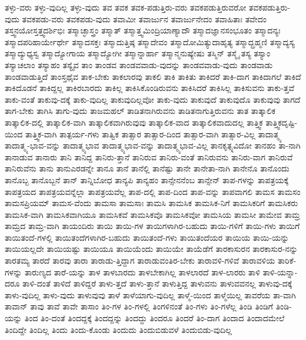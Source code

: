 {ತಳ್ಳು-ವರು
ತಳ್ಳು-ವುದಿಲ್ಲ
ತಳ್ಳು-ವುದು
ತವ
ತವಕ
ತವಕ-ಪಡುತ್ತಿರು-ವರು
ತವಕಪಡುತ್ತಿರುವರೋ
ತವಕಪಡುತ್ತಿರು-ವುದು
ತವಕಪಡು-ವರು
ತವಕಪಡು-ವುದು
ತವಾಮೀ
ತವಾರ್ಜುನ
ತವಾರ್ಜುನೇದಂ
ತವಾಹಿತಾಃ
ತವೇದಂ
ತಸ್ತ್ವನಯೋಸ್ತತ್ತ್ವದರ್ಶಿಭಿಃ
ತಸ್ಮಾಚ್ಛಾಸ್ತ್ರಂ
ತಸ್ಮಾತ್
ತಸ್ಮಾತ್ತ್ವಮಿಂದ್ರಿಯಾಣ್ಯಾದೌ
ತಸ್ಮಾದಜ್ಞಾನಸಂಭೂತಂ
ತಸ್ಮಾದನ್ಯಃ
ತಸ್ಮಾದಪರಿಹಾರ್ಯೇರ್ಥೇ
ತಸ್ಮಾದಸಕ್ತಃ
ತಸ್ಮಾದುತ್ತಿಷ್ಠ
ತಸ್ಮಾದೇವಂ
ತಸ್ಮಾದೋಮಿತ್ಯುದಾಹೃತ್ಯ
ತಸ್ಮಾದ್ಬ್ರಹ್ಮಣಿ
ತಸ್ಮಾದ್ಯಸ್ಯ
ತಸ್ಮಾದ್ಯುಧ್ಯಸ್ವ
ತಸ್ಮಾದ್ಯೋಗಾಯ
ತಸ್ಮಾದ್ಯೋಗೀ
ತಸ್ಮಾನ್ನಾರ್ಹಾ
ತಸ್ಮಾನ್ಮನುಷ್ಯೇಷು
ತಸ್ಮಿನ್
ತಸ್ಮೈ
ತಸ್ಯ
ತಸ್ಯಾಂ
ತಸ್ಯಾಚಲಾಂ
ತಸ್ಯಾಹಂ
ತಸ್ಯೈವ
ತಾಂ
ತಾಂಡವ
ತಾಂಡವವಾಡು-ವುದನ್ನು
ತಾಂಡವವಾಡು-ವುದು
ತಾಂಡವಾಡು
ತಾಂಡವಾಡುತ್ತಿದೆ
ತಾಂಸ್ತಥೈವ
ತಾಕ-ಬೇಕು
ತಾಕಲಾರವು
ತಾಕಲಿ
ತಾಕಿ
ತಾಕಿತು
ತಾಕಿದರೆ
ತಾಕಿ-ದಾಗ
ತಾಕಿದಾಗಲೆ
ತಾಕಿದೆ
ತಾಕಿದೊಡನೆ
ತಾಕಿದ್ದಲ್ಲ
ತಾಕಿರಬಾರದು
ತಾಕಿಲ್ಲ
ತಾಕಿಸಿಕೊಂಡಿರುವನು
ತಾಕಿಸಿದರೆ
ತಾಕಿಸಿಲ್ಲ
ತಾಕಿಸುವನು
ತಾಕು-ತ್ತವೆ
ತಾಕು-ವಂತೆ
ತಾಕುವು-ದಕ್ಕೆ
ತಾಕು-ವುದಿಲ್ಲ
ತಾಕುವುದಿಲ್ಲವೋ
ತಾಕು-ವುದು
ತಾಕುವುದೆ
ತಾಕುವುದೊ
ತಾಕುವುವು
ತಾಗದೆ
ತಾಗ-ಬೇಕು
ತಾಗಿಸಿ
ತಾಗು-ವುದು
ತಾಜಮಹಲ್
ತಾಡಿತನಾಗಿರುವನು
ತಾಡಿತನಾಗುತ್ತಿರುವನು
ತಾತ
ತಾತ್ಕಾಲಿಕ
ತಾತ್ಕಾಲಿಕ-ದಲ್ಲಿ
ತಾತ್ಕಾಲಿಕ-ವಾಗಿ
ತಾತ್ಕಾಲಿಕವಾಗಿರುವುವು
ತಾತ್ಕಾಲಿಕ-ವಾದ
ತಾತ್ಕಾಲಿಕವಾದುದಲ್ಲ
ತಾತ್ತ್ವಿಕ
ತಾತ್ತ್ವಿಕದೃಷ್ಟಿ-ಯಿಂದ
ತಾತ್ತ್ವಿಕ-ವಾಗಿ
ತಾತ್ಪರ್ಯ-ಗಳು
ತಾತ್ವಿಕ
ತಾತ್ಸಾರ
ತಾತ್ಸಾರ-ದಿಂದ
ತಾತ್ಸಾರ-ವಾಗಿ
ತಾತ್ಸಾರ-ವಿಲ್ಲ
ತಾದಾತ್ಮ್ಯ
ತಾದಾತ್ಮ್ಯ-ಭಾವ-ವನ್ನು
ತಾದಾತ್ಮ್ಯಭಾವ
ತಾದಾತ್ಮ್ಯಭಾವ-ವನ್ನು
ತಾದಾತ್ಮ್ಯಭಾವ-ವಿಲ್ಲ
ತಾನಕೃತ್ಸ್ನವಿದೋ
ತಾನಹಂ
ತಾ-ನಾಗಿ
ತಾನಾಡುವ
ತಾನಾರು
ತಾನಿ
ತಾನಿದ್ದ
ತಾನಿರು-ತ್ತಾನೆ
ತಾನಿರುವ
ತಾನಿರು-ವಂತೆ
ತಾನಿರುವನು
ತಾನಿರು-ವಾಗ
ತಾನಿರುವೆ
ತಾನಿರುವೆನು
ತಾನು
ತಾನುಎರಡನ್ನೇ
ತಾನೂ
ತಾನೆ
ತಾನೆಲ್ಲಿ
ತಾನೆಷ್ಟು
ತಾನೇ
ತಾನೇತಾ-ನಾಗಿ
ತಾನೇನೊ
ತಾನೊಂದು
ತಾನೊಬ್ಬ
ತಾನೊಬ್ಬನೆ
ತಾನ್
ತಾನ್ನಿಬೋಧ
ತಾನ್ಯಪಿ
ತಾನ್ಯಹಂ
ತಾನ್ಸೇನನೆಂಬ
ತಾನ್ಸೇನ್
ತಾಪ-ಗಳನ್ನು
ತಾಪತ್ರಯಕ್ಕೆ
ತಾಪತ್ರಯದ
ತಾಪತ್ರಯವನ್ನೆಲ್ಲಾ
ತಾಪತ್ರಯವೆಲ್ಲ
ತಾಪ-ದಲ್ಲಿ
ತಾಪ-ದಿಂದ
ತಾಪ-ವನ್ನು
ತಾಪವಾಗಲಿ
ತಾಮಸ
ತಾಮಸಂ
ತಾಮಸಪ್ರಿಯಮ್
ತಾಮಸ-ವೆಂದು
ತಾಮಸಾ
ತಾಮಸಾಃ
ತಾಮಸಿ
ತಾಮಸಿಕ
ತಾಮಸಿಕ-ನಿಗೆ
ತಾಮಸಿಕರಿಗೆ
ತಾಮಸಿಕರು
ತಾಮಸಿಕ-ವಾಗಿ
ತಾಮಸಿಕವಾಗಿಯೂ
ತಾಮಸಿಕವೆ
ತಾಮಸಿಕವೊ
ತಾಮಸಿಕವೋ
ತಾಮಸಿಯ
ತಾಮಸೀ
ತಾಮೇವ
ತಾಮ್ರ
ತಾಮ್ರದ
ತಾಮ್ರ-ವಾಗಿ
ತಾಯಂದಿರು
ತಾಯಿ
ತಾಯಿ-ಗಳ
ತಾಯಿಗಳಾಗಿರ-ಬಹುದು
ತಾಯಿ-ಗಳಿಗೆ
ತಾಯಿ-ಗಳು
ತಾಯಿಗೆ
ತಾಯಿತಂದೆ-ಗಳಲ್ಲಿ
ತಾಯಿತಂದೆಗಳಾಗಿರ-ಬಹುದು
ತಾಯಿತಂದೆ-ಗಳು
ತಾಯಿತಂದೆಯರ
ತಾಯಿಯ
ತಾಯಿ-ಯನ್ನು
ತಾಯಿಯಲ್ಲದೇ
ತಾಯಿಯಷ್ಟು
ತಾಯಿಯೂ
ತಾಯಿಯೆಂದು
ತಾಯಿಯೇ
ತಾಯೆಡೆಗೆ
ತಾರಕಾಸುರನ
ತಾರಕಾಸುರ-ನನ್ನು
ತಾರತಮ್ಯ
ತಾರದೆ
ತಾರವು
ತಾರಾ
ತಾರಾಡು-ತ್ತಿದ್ದಾಗ
ತಾರಾಡುವಂತಿರ-ಬೇಕು
ತಾರಾವಳಿ-ಗಳಿವೆ
ತಾರಾವಳಿಯ
ತಾರಿಕೆ-ಗಳನ್ನು
ತಾರುಣ್ಯದ
ತಾರೆ-ಯನ್ನು
ತಾಳ
ತಾಳಬಾರದು
ತಾಳಬೇಕಾಗಿಲ್ಲ
ತಾಳಲಾರದೆ
ತಾಳ-ಲಾರರು
ತಾಳಿ
ತಾಳಿ-ಯನ್ನಾ-ದರೂ
ತಾಳಿ-ದಂತೆ
ತಾಳಿದೆ
ತಾಳಿದ್ದರೆ
ತಾಳು-ತ್ತದೆ
ತಾಳು-ತ್ತಾನೆ
ತಾಳುತ್ತಿದ್ದ
ತಾಳುವನು
ತಾಳುವವನಲ್ಲ
ತಾಳುವು-ದಕ್ಕೆ
ತಾಳು-ವುದಿಲ್ಲ
ತಾಳು-ವುದು
ತಾಳುವುವು
ತಾಳೆ
ತಾಳೆಯಾಗು-ವುದಿಲ್ಲ
ತಾಳ್ಮೆ-ಯಿಂದ
ತಾಳ್ಮೆಯಿಲ್ಲ
ತಾವರೆಯ
ತಾ-ವಾಗಿ
ತಾವಾನ್
ತಾವು
ತಾವೆ
ತಾವೇ
ತಾಸಾಂ
ತಿಂ-ಗಳ
ತಿಂ-ಗಳಲ್ಲಿ
ತಿಂಗಳಿನಂತೆ
ತಿಂ-ಗಳು
ತಿಂ-ಗಳೆಲ್ಲ
ತಿಂಡಿ
ತಿಂಡಿಗೆ
ತಿಂಡಿ-ಯನ್ನು
ತಿಂದ
ತಿಂ-ದಂತೆ
ತಿಂದದ್ದಕ್ಕೆ
ತಿಂದದ್ದನ್ನು
ತಿಂದದ್ದು
ತಿಂದರೂ
ತಿಂದರೆ
ತಿಂ-ದಾಗ
ತಿಂದಾದ
ತಿಂದಾದಮೇಲೆ
ತಿಂದಿದ್ದೇ
ತಿಂದಿಲ್ಲ
ತಿಂದು
ತಿಂದು-ಕೊಂಡು
ತಿಂದುದು
ತಿಂದುಬಿಡುವಳೆ
ತಿಂದುಬಿಡು-ವುದಿಲ್ಲ
}
